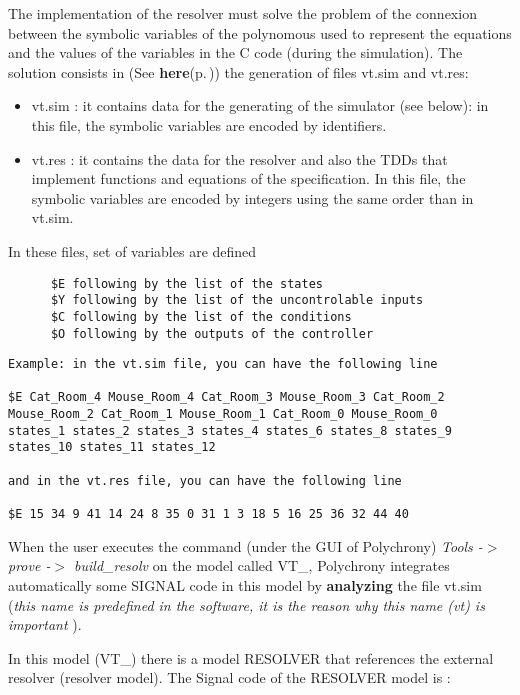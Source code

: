 The implementation of the resolver must solve the problem of the connexion between the symbolic variables of the polynomous used to represent the equations and the values of the variables in the C code (during the simulation). The solution consists in (See {\bf here}{\rm (p.\,\pageref{index_sectB})}) the generation of files vt.sim and vt.res:\begin{itemize}
\item vt.sim : it contains data for the generating of the simulator (see below): in this file, the symbolic variables are encoded by identifiers.\item vt.res : it contains the data for the resolver and also the TDDs that implement functions and equations of the specification. In this file, the symbolic variables are encoded by integers using the same order than in vt.sim.\end{itemize}


In these files, set of variables are defined 

\footnotesize\begin{verbatim}      $E following by the list of the states
      $Y following by the list of the uncontrolable inputs
      $C following by the list of the conditions
      $O following by the outputs of the controller
\end{verbatim}
\normalsize




\footnotesize\begin{verbatim}Example: in the vt.sim file, you can have the following line

$E Cat_Room_4 Mouse_Room_4 Cat_Room_3 Mouse_Room_3 Cat_Room_2 Mouse_Room_2 Cat_Room_1 Mouse_Room_1 Cat_Room_0 Mouse_Room_0 
states_1 states_2 states_3 states_4 states_6 states_8 states_9 states_10 states_11 states_12

and in the vt.res file, you can have the following line

$E 15 34 9 41 14 24 8 35 0 31 1 3 18 5 16 25 36 32 44 40
\end{verbatim}
\normalsize


When the user executes the command (under the GUI of Polychrony) {\em  Tools -$>$ prove -$>$ build\_\-resolv \/} on the model called VT\_, Polychrony integrates automatically some SIGNAL code in this model by {\bf analyzing} the file vt.sim ({\em  this name is predefined in the software, it is the reason why this name (vt) is important \/}).

In this model (VT\_) there is a model RESOLVER that references the external resolver (resolver model). The Signal code of the RESOLVER model is : 

